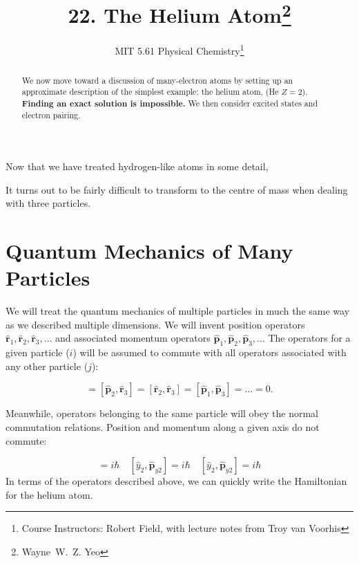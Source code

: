 \documentclass[a4paper]{tufte-handout}
\title{22. The Helium Atom\thanks{Wayne~W.~Z. Yeo}}
\author[MIT 5.61]{\textnormal{MIT 5.61} Physical Chemistry\thanks{Course Instructors: Robert Field, with lecture notes from Troy van Voorhis}}
\theoremstyle{definition}
\begin{document}
\maketitle%

\begin{abstract}
\noindent
We now move toward a discussion of many-electron atoms by setting up an approximate description of the
simplest example: the helium atom, (He $Z = 2$). \textbf{Finding an exact solution is impossible.} We then
consider excited states and electron pairing.

\end{abstract}

Now that we have treated hydrogen-like atoms in some detail,

It turns out to be fairly difficult to transform to the centre of mass when dealing with three particles.

\section{Quantum Mechanics of Many Particles}

We will treat the quantum mechanics of multiple particles in much the same way as we described multiple dimensions. We
will invent position operators $\hat{\mathbf{r}}_1, \hat{\mathbf{r}}_2, \hat{\mathbf{r}}_3, \dots$ and associated momentum operators $\hat{\mathbf{p}}_1, \hat{\mathbf{p}}_2, \hat{\mathbf{p}}_3, \dots$
The operators for a given particle ($i$) will be assumed to commute with all operators associated with any other particle ($j$):

\begin{equation*}
  [\hat{\mathbf{r}}_1, \hat{\mathbf{p}}_2] = [\hat{\mathbf{p}}_2, \hat{\mathbf{r}}_3] = [\hat{\mathbf{r}}_2, \hat{\mathbf{r}}_3] = [\hat{\mathbf{p}}_1, \hat{\mathbf{p}}_3] = \dots = 0.
\end{equation*}

Meanwhile, operators belonging to the same particle will obey the normal commutation relations. Position and momentum along a given axis
do not commute:

\begin{equation*}
  [\hat{x}_1, \hat{\mathbf{p}}_{x1}] = i\hbar \quad [\hat{y}_2, \hat{\mathbf{p}}_{y2}] = i \hbar \quad [\hat{y}_2, \hat{\mathbf{p}}_{y2}] = i \hbar
\end{equation*}In terms of the operators described above, we can quickly write the Hamiltonian for the helium atom.
\end{document}
